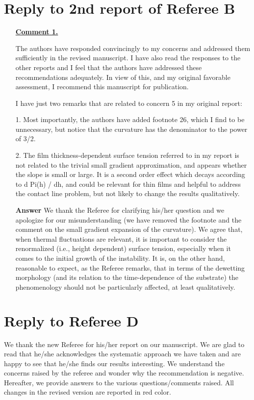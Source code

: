 \documentclass[12pt,english]{article}
\begin{document}
\section*{Reply to 2nd report of Referee B}
\begin{itemize}  
\item[ \textbf{\underline{Comment 1.}}]
{ 
The authors have responded convincingly to my concerns and addressed
them sufficiently in the revised manuscript. I have also read the
responses to the other reports and I feel that the authors have
addressed these recommendations adequately. In view of this, and my
original favorable assessment, I recommend this manuscript for
publication.

I have just two remarks that are related to concern 5 in my original
report:

1. Most importantly, the authors have added footnote 26, which I find
to be unnecessary, but notice that the curvature has the denominator
to the power of 3/2.

2. The film thickness-dependent surface tension referred to in my
report is not related to the trivial small gradient approximation, and
appears whether the slope is small or large. It is a second order
effect which decays according to d Pi(h) / dh, and could be relevant
for thin films and helpful to address the contact line problem, but
not likely to change the results qualitatively.
}

\item[ \textbf{{Answer}}]
{
We thank the Referee for clarifying his/her question and we apologize for 
our misunderstanding (we have removed the footnote and the comment on 
the small gradient expansion of the curvature). 
We agree that, when thermal fluctuations are relevant,
it is important to consider the renormalized (i.e., height dependent) surface tension,
especially when it comes to the initial growth of the instability. It is, on the other 
hand, reasonable to expect, as the Referee remarks, that in terms of the dewetting 
morphology (and its relation to the time-dependence of the substrate) the phenomenology
should not be particularly affected, at least qualitatively.
}
\end{itemize}  


\section*{Reply to Referee D}
We thank the new Referee for his/her report on our manuscript. 
We are glad to read that he/she acknowledges the systematic approach we have taken and are happy to see that he/she finds our results interesting. 
We understand the concerns raised by the referee and wonder why the recommendation is negative.
Hereafter, we provide answers to the various questions/comments raised. 
All changes in the revised version are reported in red color.
\end{document}
